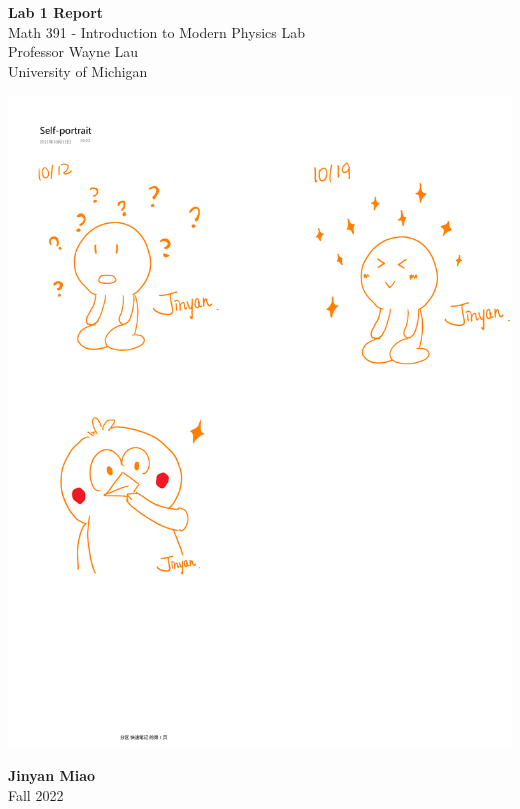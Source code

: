 \documentclass[11pt]{book}
\theoremstyle{break}
\theoremstyle{break}
\begin{document}
	\begin{titlepage}
		\begin{center}
			\vspace*{1cm}
			\Huge \color{red}
				\textbf{Lab 1 Report}\\
			\vspace{0.5cm}			
			\Large \color{black}
				Math 391 - Introduction to Modern Physics Lab\\
				Professor Wayne Lau\\	
				University of Michigan\\
			\vspace{3cm}

			\includegraphics[scale=1.16]{hmm.pdf}
			
			
			\vspace{5cm}
			\LARGE
				\textbf{Jinyan Miao}\\
				\hfill\break
				\LARGE Fall 2022\\
			\vspace{1cm}

		\vspace*{\fill}
		\end{center}			
	\end{titlepage}
\end{document}
